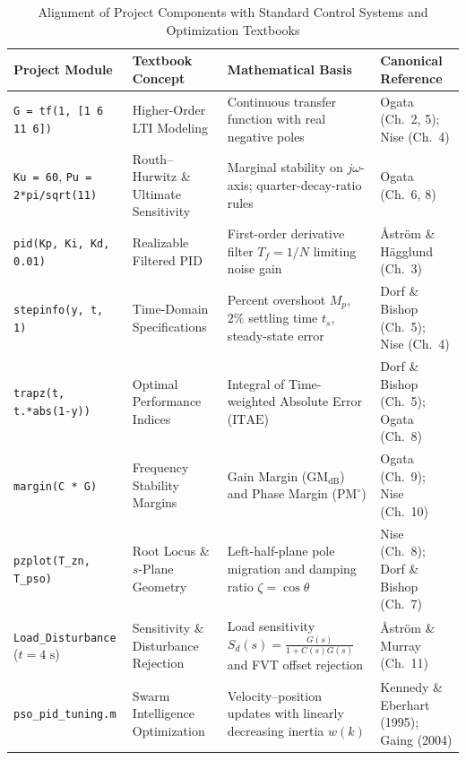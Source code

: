 \documentclass[11pt,a4paper]{article}
\begin{document}
\begin{table}[H]
  \centering
  \caption{Alignment of Project Components with Standard Control Systems and Optimization Textbooks}
  \label{tab:textbook_mapping}
  \small
  \begin{tabularx}{\textwidth}{>{\raggedright\arraybackslash}p{} >{\raggedright\arraybackslash}p{} >{\raggedright\arraybackslash}p{} >{\raggedright\arraybackslash}X}
    \toprule
    \textbf{Project Module} & \textbf{Textbook Concept} & \textbf{Mathematical Basis} & \textbf{Canonical Reference} \\
    \midrule
    \texttt{G = tf(1, [1 6 11 6])} & Higher-Order LTI Modeling & Continuous transfer function with real negative poles & Ogata (Ch.\ 2, 5); Nise (Ch.\ 4) \\
    \addlinespace[3pt]
    \texttt{Ku = 60}, \texttt{Pu = 2*pi/sqrt(11)} & Routh--Hurwitz \& Ultimate Sensitivity & Marginal stability on $j\omega$-axis; quarter-decay-ratio rules & Ogata (Ch.\ 6, 8) \\
    \addlinespace[3pt]
    \texttt{pid(Kp, Ki, Kd, 0.01)} & Realizable Filtered PID & First-order derivative filter $T_f = 1/N$ limiting noise gain & \AA str\"om \& H\"agglund (Ch.\ 3) \\
    \addlinespace[3pt]
    \texttt{stepinfo(y, t, 1)} & Time-Domain Specifications & Percent overshoot $M_p$, $2\%$ settling time $t_s$, steady-state error & Dorf \& Bishop (Ch.\ 5); Nise (Ch.\ 4) \\
    \addlinespace[3pt]
    \texttt{trapz(t, t.*abs(1-y))} & Optimal Performance Indices & Integral of Time-weighted Absolute Error ($\text{ITAE}$) & Dorf \& Bishop (Ch.\ 5); Ogata (Ch.\ 8) \\
    \addlinespace[3pt]
    \texttt{margin(C * G)} & Frequency Stability Margins & Gain Margin ($\text{GM}_{\text{dB}}$) and Phase Margin ($\text{PM}^\circ$) & Ogata (Ch.\ 9); Nise (Ch.\ 10) \\
    \addlinespace[3pt]
    \texttt{pzplot(T\_zn, T\_pso)} & Root Locus \& $s$-Plane Geometry & Left-half-plane pole migration and damping ratio $\zeta = \cos\theta$ & Nise (Ch.\ 8); Dorf \& Bishop (Ch.\ 7) \\
    \addlinespace[3pt]
    \texttt{Load\_Disturbance} ($t=4\text{ s}$) & Sensitivity \& Disturbance Rejection & Load sensitivity $S_d(s) = \frac{G(s)}{1+C(s)G(s)}$ and FVT offset rejection & \AA str\"om \& Murray (Ch.\ 11) \\
    \addlinespace[3pt]
    \texttt{pso\_pid\_tuning.m} & Swarm Intelligence Optimization & Velocity--position updates with linearly decreasing inertia $w(k)$ & Kennedy \& Eberhart (1995); Gaing (2004) \\
    \bottomrule
  \end{tabularx}
\end{table}
\end{document}
